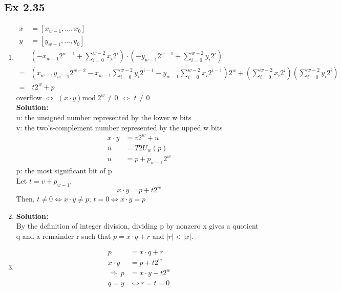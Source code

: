 \subsection{Ex 2.35}
\begin{enumerate}
    \item 
    \begin{align*}
        x &= \left[ x_{w - 1}, \dots, x_0 \right]\\ 
        y &= \left[ y_{w - 1}, \dots, y_0 \right]\\
          &\left( -x_{w - 1}2^{w - 1} + \sum_{i=0}^{w - 2} x_i2^i \right) \cdot \left( -y_{w - 1}2^{w - 1} + \sum_{i = 0}^{w - 2} y_i2^i \right)\\
        =&\left( x_{w-1}y_{w-1}2^{w-2} - x_{w-1}\sum_{i=0}^{w-2} y_i2^{i-1} - y_{w-1}\sum_{i=0}^{w-2} x_i2^{i-1} \right) 2^w + \left( \sum_{i=0}^{w-2}x_i2^i \right)\left( \sum_{i=0}^{w-2} y_i2^i \right) \\
        =&\ t2^w + p
    \end{align*}
    overflow $\Leftrightarrow$ $\left( x \cdot y \right) \text{mod}\ 2^w \neq 0$ $\Leftrightarrow$ $t \neq 0$\\
    {\color{red}\textbf{Solution: }\\
        u: the unsigned number represented by the lower w bits\\
        v: the two's-complement number represented by the upped w bits
        \begin{align*}
            x \cdot y &= v2^w + u\\
            u &= T2U_w(p)\\
            u &= p + p_{w-1}2^w
        \end{align*}
        p: the most significant bit of p\\
        Let $t = v + p_{w-1}$,
        $$x \cdot y = p + t2^w$$
        Then, $t \neq 0 \Leftrightarrow x \cdot y \neq p$; $t = 0 \Leftrightarrow x \cdot y = p$
    }
    \item 
        {\color{red}\textbf{Solution: }\\
            By the definition of integer division, dividing p by nonzero x gives a quotient q and a remainder r such that $p = x \cdot q + r$ and $|r| < |x|$.
        }
    \item 
    \begin{align*}
        p &= x \cdot q + r \\
        x \cdot y &= p + t2^w\\
        \Rightarrow\ p &= x \cdot y - t2^w\\
        q = y &\Leftrightarrow r = t = 0
    \end{align*}
\end{enumerate}

